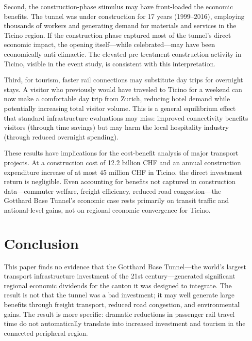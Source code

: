 \documentclass[12pt]{article}
\begin{document}
Second, the construction-phase stimulus may have front-loaded the economic benefits. The tunnel was under construction for 17 years (1999--2016), employing thousands of workers and generating demand for materials and services in the Ticino region. If the construction phase captured most of the tunnel's direct economic impact, the opening itself---while celebrated---may have been economically anti-climactic. The elevated pre-treatment construction activity in Ticino, visible in the event study, is consistent with this interpretation.

Third, for tourism, faster rail connections may substitute day trips for overnight stays. A visitor who previously would have traveled to Ticino for a weekend can now make a comfortable day trip from Zurich, reducing hotel demand while potentially increasing total visitor volume. This is a general equilibrium effect that standard infrastructure evaluations may miss: improved connectivity benefits visitors (through time savings) but may harm the local hospitality industry (through reduced overnight spending).

These results have implications for the cost-benefit analysis of major transport projects. At a construction cost of 12.2 billion CHF and an annual construction expenditure increase of at most 45 million CHF in Ticino, the direct investment return is negligible. Even accounting for benefits not captured in construction data---commuter welfare, freight efficiency, reduced road congestion---the Gotthard Base Tunnel's economic case rests primarily on transit traffic and national-level gains, not on regional economic convergence for Ticino.

\section{Conclusion}

This paper finds no evidence that the Gotthard Base Tunnel---the world's largest transport infrastructure investment of the 21st century---generated significant regional economic dividends for the canton it was designed to integrate. The result is not that the tunnel was a bad investment; it may well generate large benefits through freight transport, reduced road congestion, and environmental gains. The result is more specific: dramatic reductions in passenger rail travel time do not automatically translate into increased investment and tourism in the connected peripheral region.
\end{document}
